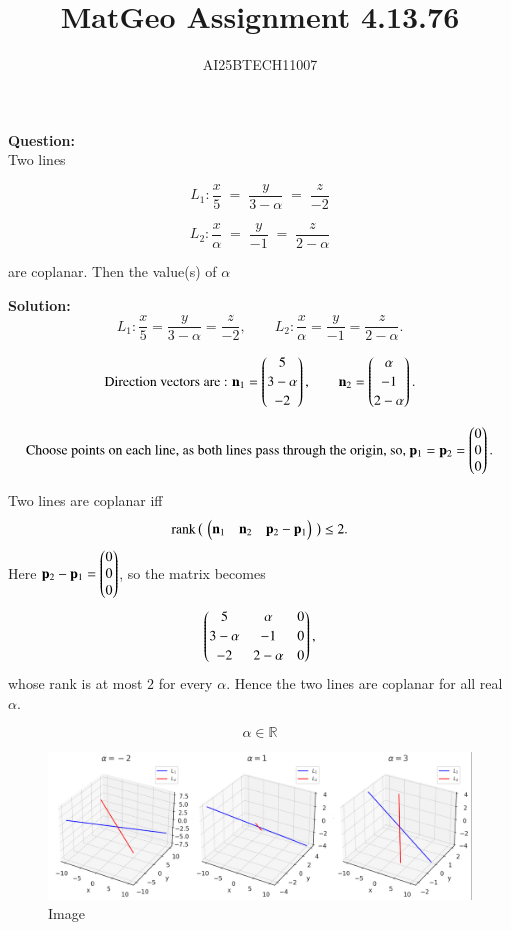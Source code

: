 \documentclass[journal]{IEEEtran}
\begin{document}

\vspace{3cm}

\title{MatGeo Assignment 4.13.76}
\author{AI25BTECH11007}
 \maketitle
{\let\newpage\relax\maketitle}

\renewcommand{\thefigure}{\theenumi}
\renewcommand{\thetable}{\theenumi}
\setlength{\intextsep}{10pt} %


\renewcommand{\thetable}{\theenumi}
\noindent
\textbf{Question:}\\
 Two lines

\[
L_1 : \frac{x}{5} \;=\; \frac{y}{3-\alpha} \;=\; \frac{z}{-2}
\]

\[
L_2 : \frac{x}{\alpha} \;=\; \frac{y}{-1} \;=\; \frac{z}{2-\alpha}
\]

are coplanar. Then the value(s) of \(\alpha\)

\textbf{Solution:}\\
\[
L_1 : \frac{x}{5}=\frac{y}{3-\alpha}=\frac{z}{-2},\qquad
L_2 : \frac{x}{\alpha}=\frac{y}{-1}=\frac{z}{2-\alpha}.
\]

\[
\text {Direction vectors are :   } 
\mathbf n_1=\begin{pmatrix}5\\[2pt]3-\alpha\\[2pt]-2\end{pmatrix},\qquad
\mathbf n_2=\begin{pmatrix}\alpha\\[2pt]-1\\[2pt]2-\alpha\end{pmatrix}.
\]

\[
\text{Choose points on each line, as both lines pass through the origin, so, }\\
\mathbf p_1=\mathbf p_2=\begin{pmatrix}0\\0\\0\end{pmatrix}.
\]

Two lines are coplanar iff
\[
\operatorname{rank}\big(\, \begin{pmatrix}\mathbf n_1 & \mathbf n_2 & \mathbf p_2-\mathbf p_1\end{pmatrix}\,\big)\le 2.
\]
Here \(\mathbf p_2-\mathbf p_1=\begin{pmatrix}0\\0\\0\end{pmatrix}\), so the matrix becomes
\[
\begin{pmatrix}5 & \alpha & 0\\[2pt] 3-\alpha & -1 & 0\\[2pt] -2 & 2-\alpha & 0\end{pmatrix},
\]
whose rank is at most \(2\) for every \(\alpha\). Hence the two lines are coplanar for all real \(\alpha\).

\[
\boxed{\alpha\in\mathbb R}
\]

\begin{figure}[H]
    \centering
    \includegraphics[width=1.0\linewidth]{figs/image.png}
    \caption{Image}
    \label{fig:placeholder}
\end{figure}
\end{document}
